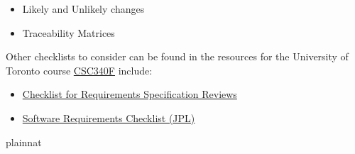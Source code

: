 \documentclass[12pt]{article}
\begin{document}
\begin{itemize}
  \item Likely and Unlikely changes

  \item Traceability Matrices

\end{itemize}

Other checklists to consider can be found in the resources for the University
of Toronto course
\href{https://www.cs.toronto.edu/~sme/CSC340F/2005/assignments/inspections/}
{CSC340F} include:

\begin{itemize}
  \item
        \href{https://www.cs.toronto.edu/~sme/CSC340F/2005/assignments/inspections/reqts_checklist.pdf}
        {Checklist for Requirements Specification Reviews}
  \item
        \href{https://www.cs.toronto.edu/~sme/CSC340F/2005/assignments/inspections/JPL_reqts_clist.pdf}
        {Software Requirements Checklist (JPL)}
\end{itemize}

 {plainnat}

\end{document}
